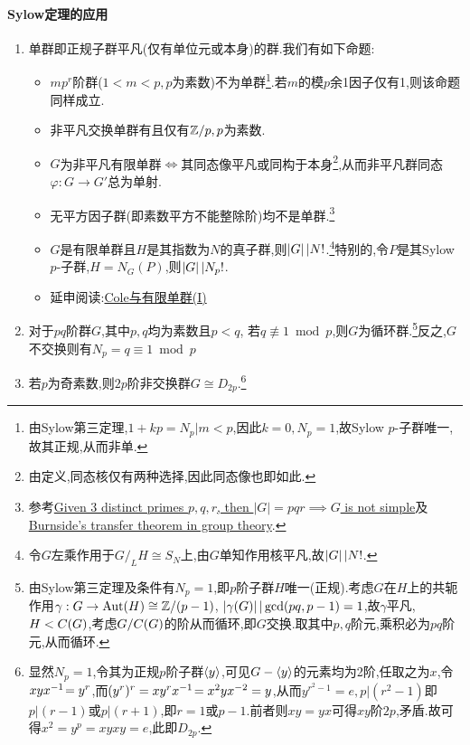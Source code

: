 \documentclass[11pt]{article} %
\begin{document}
\paragraph{Sylow定理的应用}
\begin{enumerate}
    \item 单群即正规子群平凡(仅有单位元或本身)的群.我们有如下命题:
    \begin{itemize}
        \item $mp^r$阶群($1<m<p, p$为素数)不为单群\footnote{由Sylow第三定理,$1+kp=N_p|m<p$,因此$k=0, N_p=1$,故Sylow $p$-子群唯一,故其正规,从而非单.}.若$m$的模$p$余1因子仅有1,则该命题同样成立.
        \item 非平凡交换单群有且仅有$\mathbb{Z}/p, p$为素数.
        \item $G$为非平凡有限单群$\iff$其同态像平凡或同构于本身\footnote{由定义,同态核仅有两种选择,因此同态像也即如此.},从而非平凡群同态$\varphi:G\to G'$总为单射.
        \item 无平方因子群(即素数平方不能整除阶)均不是单群.\footnote{参考\href{https://math.stackexchange.com/a/242811}{Given 3 distinct primes $p,q,r$, then $|G|=pqr\implies G$ is not simple}及\href{https://math.stackexchange.com/questions/2842126}{Burnside's transfer theorem in group theory}.}
        \item $G$是有限单群且$H$是其指数为$N$的真子群,则$\left|G\right||N!$.\footnote{令$G$左乘作用于$G/_L H\cong S_N$上,由$G$单知作用核平凡,故$\left|G\right||N!$.}特别的,令$P$是其Sylow $p$-子群,$H=N_G(P)$,则$\left|G\right||N_p!$.
        \item 延申阅读:\href{https://zhuanlan.zhihu.com/p/25301636}{Cole与有限单群(I)}
    \end{itemize}
    \item 对于$pq$阶群$G$,其中$p,q$均为素数且$p<q$, 若$q\not\equiv 1\bmod p$,则$G$为循环群.\footnote{由Sylow第三定理及条件有$N_p=1$,即$p$阶子群$H$唯一(正规).考虑$G$在$H$上的共轭作用$\gamma:G\to \operatorname{Aut}(H)\cong\mathbb{Z}/(p-1)$, $\left|\gamma(G)\right||\gcd(pq,p-1)=1$,故$\gamma$平凡,$H<C(G)$,考虑$G/C(G)$的阶从而循环,即$G$交换.取其中$p,q$阶元,乘积必为$pq$阶元,从而循环.}反之,$G$不交换则有$N_p=q\equiv 1\bmod p$
    \item 若$p$为奇素数,则$2p$阶非交换群$G\cong D_{2p}$.\footnote{显然$N_p=1$,令其为正规$p$阶子群$\left<y\right>$,可见$G-\left<y\right>$的元素均为2阶,任取之为$x$,令$xyx^{-1}\!=y^r$,而$(y^r)^r=xy^rx^{-1}\!=x^2yx^{-2}=y$,从而$y^{r^2-1}=e, p|(r^2-1)$即$p|(r-1)$或$p|(r+1)$,即$r=1$或$p-1$.前者则$xy=yx$可得$xy$阶$2p$,矛盾.故可得$x^2=y^p=xyxy=e$,此即$D_{2p}$.}
\end{enumerate}
\end{document}
